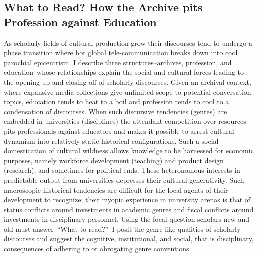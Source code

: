 \documentclass[]{book}
\theoremstyle{definition}
\theoremstyle{definition}
\theoremstyle{definition}
\theoremstyle{remark}
\begin{document}
\hypertarget{what-to-read-how-the-archive-pits-profession-against-education}{%
\subsection{What to Read? How the Archive pits Profession against
Education}\label{what-to-read-how-the-archive-pits-profession-against-education}}




























As scholarly fields of cultural production grow their
discourses tend to undergo a phase transition where hot global
tele-communication breaks down into cool parochial epicentrism. I
describe three structures--archives, profession, and education--whose
relationships explain the social and cultural forces leading to the
opening up and closing off of scholarly discourses. Given an archival
context, where expansive media collections give unlimited scope to
potential conversation topics, education tends to heat to a boil and
profession tends to cool to a condensation of discourses. When such
discursive tendencies (genres) are embedded in universities
(disciplines) the attendant competition over resources pits
professionals against educators and makes it possible to arrest cultural
dynamism into relatively static historical configurations. Such a social
domestication of cultural wildness allows knowledge to be harnessed for
economic purposes, namely workforce development (teaching) and product
design (research), and sometimes for political ends. These heteronomous
interests in predictable output from universities depresses their
cultural generativity. Such macroscopic historical tendencies are
difficult for the local agents of their development to recognize; their
myopic experience in university arenas is that of status conflicts
around investments in academic genres and fiscal conflicts around
investments in disciplinary personnel. Using the focal question scholars
new and old must answer--``What to read?''--I posit the genre-like
qualities of scholarly discourses and suggest the cognitive,
institutional, and social, that is disciplinary, consequences of
adhering to or abrogating genre conventions.
\end{document}

